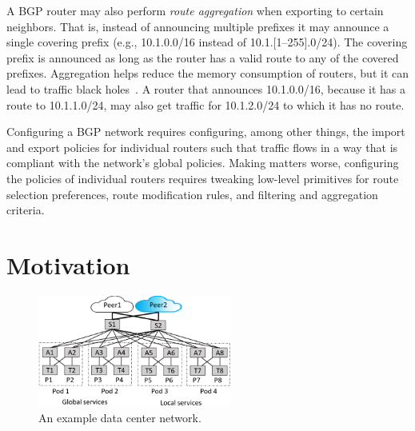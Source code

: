 \documentclass{sig-alternate-10pt}
\begin{document}
A BGP router may also perform {\em route aggregation} when exporting to certain neighbors. That is, instead of announcing multiple prefixes it may announce a single covering prefix (e.g., 10.1.0.0/16 instead of 10.1.[1--255].0/24). The covering prefix is announced as long as the router has a valid route to any of the covered prefixes. Aggregation helps reduce the memory consumption of routers, but it can lead to traffic black holes~\cite{route-aggregation}. A router that announces 10.1.0.0/16, because it has a route to 10.1.1.0/24, may also get traffic for 10.1.2.0/24 to which it has no route.


Configuring a BGP network requires configuring, among other things, the import and export policies for individual routers such that traffic flows in a way that is compliant with the network's global policies. Making matters worse, configuring the policies of individual routers requires tweaking low-level primitives for route selection preferences, route modification rules, and filtering and aggregation criteria.

\section{Motivation}
\label{sec:motivation}


\begin{figure}[t!]
  \centering
  \includegraphics[width=2.5in]{figures/example}
  \caption{An example data center network.}
  \label{fig:example}
  \vspace{-1em}
\end{figure}
\end{document}
